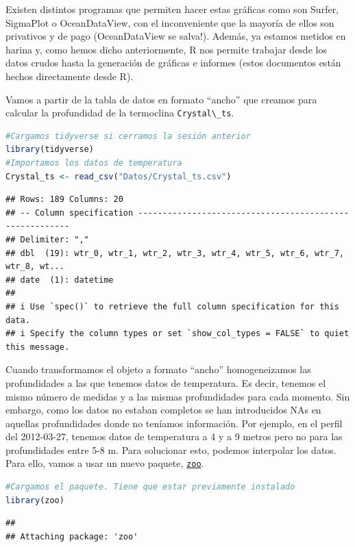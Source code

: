 \documentclass[
]{book}
\newcommand{\passthrough}[1]{#1}
\begin{document}
Existen distintos programas que permiten hacer estas gráficas como son Surfer, SigmaPlot o OceanDataView, con el inconveniente que la mayoría de ellos son privativos y de pago (OceanDataView se salva!). Además, ya estamos metidos en harina y, como hemos dicho anteriormente, R nos permite trabajar desde los datos crudos hasta la generación de gráficas e informes (estos documentos están hechos directamente desde R).

Vamos a partir de la tabla de datos en formato ``ancho'' que creamos para calcular la profundidad de la termoclina \passthrough{\lstinline!Crystal\_ts!}.

\begin{lstlisting}[language=R]
#Cargamos tidyverse si cerramos la sesión anterior
library(tidyverse)
#Importamos los datos de temperatura
Crystal_ts <- read_csv("Datos/Crystal_ts.csv")
\end{lstlisting}

\begin{lstlisting}
## Rows: 189 Columns: 20
## -- Column specification --------------------------------------------------------
## Delimiter: ","
## dbl  (19): wtr_0, wtr_1, wtr_2, wtr_3, wtr_4, wtr_5, wtr_6, wtr_7, wtr_8, wt...
## date  (1): datetime
## 
## i Use `spec()` to retrieve the full column specification for this data.
## i Specify the column types or set `show_col_types = FALSE` to quiet this message.
\end{lstlisting}

Cuando transformamos el objeto a formato ``ancho'' homogeneizamos las profundidades a las que tenemos datos de temperatura. Es decir, tenemos el mismo número de medidas y a las mismas profundidades para cada momento. Sin embargo, como los datos no estaban completos se han introducidos NAs en aquellas profundidades donde no teníamos información. Por ejemplo, en el perfil del 2012-03-27, tenemos datos de temperatura a 4 y a 9 metros pero no para las profundidades entre 5-8 m. Para solucionar esto, podemos interpolar los datos. Para ello, vamos a usar un nuevo paquete, \href{https://cran.r-project.org/web/packages/zoo/zoo.pdf}{\passthrough{\lstinline!zoo!}}.

\begin{lstlisting}[language=R]
#Cargamos el paquete. Tiene que estar previamente instalado
library(zoo)
\end{lstlisting}

\begin{lstlisting}
## 
## Attaching package: 'zoo'
\end{lstlisting}
\end{document}
